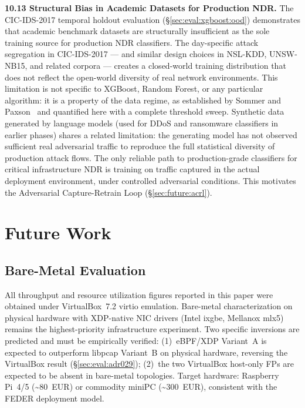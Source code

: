 \documentclass[11pt,a4paper]{article}
\begin{document}
    \textbf{10.13 Structural Bias in Academic Datasets for Production NDR.}
    The CIC-IDS-2017 temporal holdout evaluation (\S\ref{sec:eval:xgboost:ood}) demonstrates
    that academic benchmark datasets are structurally insufficient as the sole training source
    for production NDR classifiers. The day-specific attack segregation in CIC-IDS-2017 --- and
    similar design choices in NSL-KDD, UNSW-NB15, and related corpora --- creates a
    closed-world training distribution that does not reflect the open-world diversity of
    real network environments. This limitation is not specific to XGBoost, Random Forest,
    or any particular algorithm: it is a property of the data regime, as established by
    Sommer and Paxson~\cite{sommer2010} and quantified here with a complete threshold sweep.
    Synthetic data generated by language models (used for DDoS and ransomware classifiers
    in earlier phases) shares a related limitation: the generating model has not observed
    sufficient real adversarial traffic to reproduce the full statistical diversity of
    production attack flows.
    The only reliable path to production-grade classifiers for critical infrastructure
    NDR is training on traffic captured in the actual deployment environment, under
    controlled adversarial conditions. This motivates the Adversarial Capture-Retrain Loop
    (\S\ref{sec:future:acrl}).

    \section{Future Work}
    \label{sec:future}


    \subsection{Bare-Metal Evaluation}
    \label{sec:future:baremetal}
    All throughput and resource utilization figures reported in this paper were obtained
    under VirtualBox~7.2 virtio emulation. Bare-metal characterization on physical hardware
    with XDP-native NIC drivers (Intel ixgbe, Mellanox mlx5) remains the highest-priority
    infrastructure experiment. Two specific inversions are predicted and must be empirically
    verified: (1)~eBPF/XDP Variant~A is expected to outperform libpcap Variant~B on physical
    hardware, reversing the VirtualBox result (\S\ref{sec:eval:adr029}); (2)~the two
    VirtualBox host-only FPs are expected to be absent in bare-metal topologies.
    Target hardware: Raspberry Pi~4/5 (\textasciitilde80~EUR) or commodity miniPC
    (\textasciitilde300~EUR), consistent with the FEDER deployment model.
\end{document}
